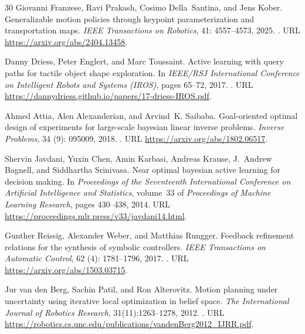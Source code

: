 \documentclass[11pt,a4paper]{article}
\numberwithin{equation}{section}
\theoremstyle{definition}
\begin{document}
\begin{thebibliography}{30}
Giovanni Franzese, Ravi Prakash, Cosimo Della~Santina, and Jens Kober.
\newblock Generalizable motion policies through keypoint parameterization and
  transportation maps.
\newblock \emph{IEEE Transactions on Robotics}, 41: 4557--4573, 2025.
\newblock {}.
\newblock URL \url{https://arxiv.org/abs/2404.13458}.

Danny Driess, Peter Englert, and Marc Toussaint.
\newblock Active learning with query paths for tactile object shape
  exploration.
\newblock In \emph{IEEE/RSJ International Conference on Intelligent Robots and
  Systems (IROS)}, pages 65--72, 2017.
\newblock {}.
\newblock URL \url{https://dannydriess.github.io/papers/17-driess-IROS.pdf}.

Ahmed Attia, Alen Alexanderian, and Arvind~K. Saibaba.
\newblock Goal-oriented optimal design of experiments for large-scale bayesian
  linear inverse problems.
\newblock \emph{Inverse Problems}, 34 (9): 095009, 2018.
\newblock {}.
\newblock URL \url{https://arxiv.org/abs/1802.06517}.

Shervin Javdani, Yuxin Chen, Amin Karbasi, Andreas Krause, J.~Andrew Bagnell,
  and Siddhartha Srinivasa.
\newblock Near optimal bayesian active learning for decision making.
\newblock In \emph{Proceedings of the Seventeenth International Conference on
  Artificial Intelligence and Statistics}, volume~33 of \emph{Proceedings of
  Machine Learning Research}, pages 430--438, 2014.
\newblock URL \url{https://proceedings.mlr.press/v33/javdani14.html}.

Gunther Reissig, Alexander Weber, and Matthias Rungger.
\newblock Feedback refinement relations for the synthesis of symbolic
  controllers.
\newblock \emph{IEEE Transactions on Automatic Control}, 62
  (4): 1781--1796, 2017.
\newblock {}.
\newblock URL \url{https://arxiv.org/abs/1503.03715}.


Jur van den Berg, Sachin Patil, and Ron Alterovitz.
\newblock Motion planning under uncertainty using iterative local optimization in belief space.
\newblock \emph{The International Journal of Robotics Research}, 31(11):1263--1278, 2012.
\newblock {}.
\newblock URL \url{https://robotics.cs.unc.edu/publications/vandenBerg2012_IJRR.pdf}.


\end{thebibliography}
\end{document}
